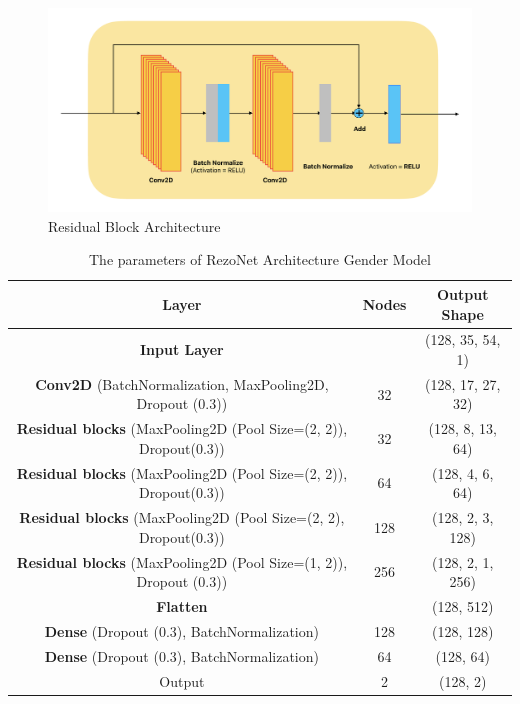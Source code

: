 \documentclass[conference, 10pt,onecolumn]{IEEEtran}
\begin{document}
\begin{figure}
    \centering
    \includegraphics[width=3 in]{Residual Block Architecture.pdf}
    \caption{Residual Block Architecture}
    \label{Residual Block Architecture}
\end{figure}

\begin{table}[]
    \centering
    \begin{tabular}{|c|c|c|}
        \hline
        \textbf{Layer} & \textbf{Nodes} & \textbf{Output Shape} \\ \hline
        \textbf{Input Layer} & & (128, 35, 54, 1)\\
        \textbf{Conv2D} (BatchNormalization, MaxPooling2D, Dropout (0.3)) & 32 & (128, 17, 27, 32)\\
        \textbf{Residual blocks} (MaxPooling2D (Pool Size=(2, 2)), Dropout(0.3))& 32& (128, 8, 13, 64)\\
        \textbf{Residual blocks} (MaxPooling2D (Pool Size=(2, 2)), Dropout(0.3))& 64&  (128, 4, 6, 64)  \\
        \textbf{Residual blocks} (MaxPooling2D (Pool Size=(2, 2), Dropout(0.3))& 128&  (128, 2, 3, 128)\\
        \textbf{Residual blocks} (MaxPooling2D (Pool Size=(1, 2)), Dropout (0.3))& 256& (128, 2, 1, 256)\\
        \textbf{Flatten} & & (128, 512) \\
        \textbf{Dense} (Dropout (0.3), BatchNormalization) & 128&  (128, 128)\\
        \textbf{Dense} (Dropout (0.3), BatchNormalization) & 64 & (128, 64)\\       
        Output & 2 & (128, 2)\\
         \hline
    \end{tabular}
    \caption{The parameters of RezoNet Architecture Gender Model}
    \label{tab:RezoNet_Gender}
\end{table}
\end{document}

